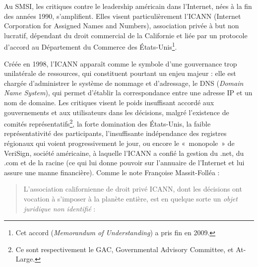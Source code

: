 \documentclass{FramateX}
\begin{document}
\begin{refsection}
Au SMSI, les critiques contre le leadership américain dans
l'Internet, nées à la fin des années 1990,
s'amplifient. Elles visent particulièrement
l'ICANN (Internet Corporation for Assigned
Names and Numbers), association privée à but non lucratif, dépendant
du droit commercial de la Californie et liée par un protocole
d'accord au Département du Commerce des
États-Unis\footnote{Cet accord (\textit{Memorandum of Understanding}) a pris fin en 2009.}.

Créée en 1998, l'ICANN apparaît comme le symbole
d'une gouvernance trop unilatérale de ressources, qui
constituent pourtant un enjeu majeur : elle est chargée
d'administrer le système de nommage et
d'adressage, le DNS (\textit{Domain Name System}), qui
permet d'établir la correspondance entre une adresse
IP et un nom de domaine. Les critiques visent le poids insuffisant
accordé aux gouvernements et aux utilisateurs dans les décisions,
malgré l'existence de comités
représentatifs\footnote{Ce sont respectivement le GAC, Governmental Advisory Committee, et
At-Large.}, la forte domination des États-Unis, la faible
représentativité des participants, l'insuffisante
indépendance des registres régionaux qui voient progressivement le
jour, ou encore le «~monopole~» de VeriSign, société américaine, à
laquelle l'ICANN a confié la gestion du .net, du .com
et de la racine (ce qui lui donne pouvoir sur
l'annuaire de l'Internet et lui
assure une manne financière). Comme le note Françoise Massit-Folléa :

\begin{quote}

L'association californienne de droit privé ICANN,
dont les décisions ont vocation à s'imposer à la
planète entière, est en quelque sorte un \textit{objet
juridique non identifié} :


\end{quote}
\end{refsection}
\end{document}

